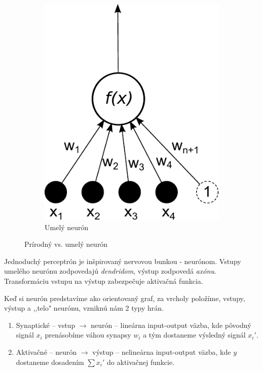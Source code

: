 \begin{figure}[hp]
\begin{center}
\begin{subfigure}[b]{0.3\textwidth}
 	  \includegraphics[width=\textwidth]{images/neuron}
 	  \caption{Umelý neurón}
 	    \label{fig:neuron}
    \end{subfigure}
  \end{center}%
  \caption{Prírodný vs. umelý neurón}
\end{figure}

Jednoduchý perceptrón je inšpirovaný nervovou bunkou - neurónom. Vstupy umelého neurónu zodpovedajú \textit{dendridom}, výstup zodpovedá \textit{axónu}. 
Transformáciu vstupu na výstup zabezpečuje aktivačná funkcia.

Keď si neurón predstavíme ako orientovaný graf, za vrcholy položíme, vstupy, výstup a ,,telo" neurónu, vzniknú nám 2 typy hrán.
\begin{enumerate}
\item Synaptické -- vstup $\rightarrow$ neurón -- lineárna input-output väzba, kde pôvodný signál $x_i$ prenásobíme váhou synapsy $w_i$ a tým dostaneme výsledný signál $x_i'$.

\item Aktivačné -- neurón $\rightarrow$ výstup -- nelineárna input-output väzba, kde $y$ dostaneme dosadením $\sum x_i'$ do aktivačnej funkcie.
\end{enumerate}

